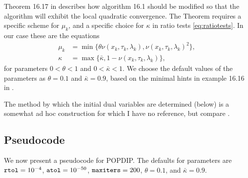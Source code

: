 \documentclass[11pt]{article}
\begin{document}
Theorem 16.17 in \cite{GrivaNashSofer2009} describes how algorithm 16.1 should be modified so that the algorithm will exhibit the local quadratic convergence.  The Theorem requires a specific scheme for $\mu_k$, and a specific choice for $\kappa$ in ratio tests \eqref{eq:ratiotests}.  In our case these are the equations
\begin{align}
\mu_k &= \min\{\theta \nu(x_k,\tau_k,\lambda_k),\nu(x_k,\tau_k,\lambda_k)^2\}, \label{eq:muupdate} \\
\kappa &= \max\{\bar\kappa,1-\nu(x_k,\tau_k,\lambda_k)\}, \label{eq:kappaformula}
\end{align}
for parameters $0<\theta<1$ and $0<\bar\kappa<1$.  We choose the default values of the parameters as $\theta=0.1$ and $\bar\kappa=0.9$, based on the minimal hints in example 16.16 in \cite{GrivaNashSofer2009}.

The method by which the initial dual variables are determined (below) is a somewhat ad hoc construction for which I have no reference, but compare \cite{Gertzetal2004}.


\subsection*{Pseudocode}

We now present a pseudocode for POPDIP.  The defaults for parameters are $\text{\texttt{rtol}}=10^{-4}$, $\text{\texttt{atol}}=10^{-50}$, $\text{\texttt{maxiters}}=200$, $\theta=0.1$, and $\bar\kappa=0.9$.
\end{document}
